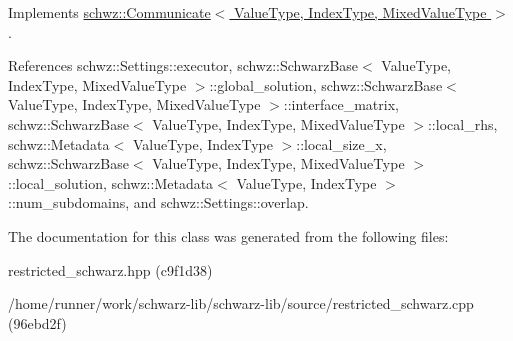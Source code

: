 Implements \hyperlink{classschwz_1_1Communicate_a371fb6c61c0bd9b619bbe7e154d18696}{schwz\+::\+Communicate$<$ Value\+Type, Index\+Type, Mixed\+Value\+Type $>$}.



References schwz\+::\+Settings\+::executor, schwz\+::\+Schwarz\+Base$<$ Value\+Type, Index\+Type, Mixed\+Value\+Type $>$\+::global\+\_\+solution, schwz\+::\+Schwarz\+Base$<$ Value\+Type, Index\+Type, Mixed\+Value\+Type $>$\+::interface\+\_\+matrix, schwz\+::\+Schwarz\+Base$<$ Value\+Type, Index\+Type, Mixed\+Value\+Type $>$\+::local\+\_\+rhs, schwz\+::\+Metadata$<$ Value\+Type, Index\+Type $>$\+::local\+\_\+size\+\_\+x, schwz\+::\+Schwarz\+Base$<$ Value\+Type, Index\+Type, Mixed\+Value\+Type $>$\+::local\+\_\+solution, schwz\+::\+Metadata$<$ Value\+Type, Index\+Type $>$\+::num\+\_\+subdomains, and schwz\+::\+Settings\+::overlap.



The documentation for this class was generated from the following files\+:\begin{DoxyCompactItemize}
\item 
restricted\+\_\+schwarz.\+hpp (c9f1d38)\item 
/home/runner/work/schwarz-\/lib/schwarz-\/lib/source/restricted\+\_\+schwarz.\+cpp (96ebd2f)\end{DoxyCompactItemize}
